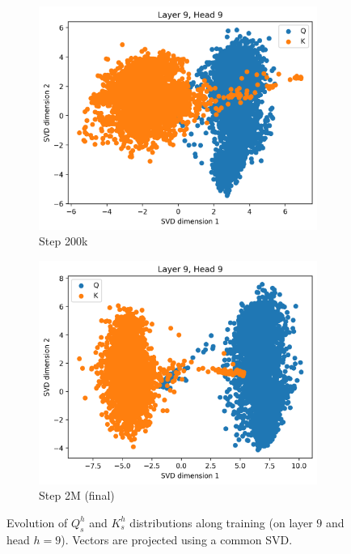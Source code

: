 \begin{figure}[ht]
    \begin{subfigure}[b]{0.43\linewidth}
         \includegraphics[width=\linewidth]{sources/part_1/anisotropy/imgs/dist_l9h9_s200.png}
         \caption{Step 200k}
         \label{fig:dist_qk_s200}
    \end{subfigure}
    \begin{subfigure}[b]{0.43\linewidth}
         \includegraphics[width=\linewidth]{sources/part_1/anisotropy/imgs/dist_l9h9_s2000.png}
         \caption{Step 2M (final)}
         \label{fig:dist_qk_s2M}
    \end{subfigure}
    \caption{Evolution of $Q^h_s$ and $K^h_s$ distributions along training (on layer $9$ and head $h=9$). Vectors are projected using a common SVD.}
    \label{fig:proj_qk_heads}
\end{figure}

